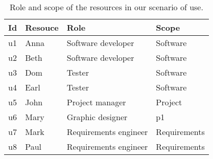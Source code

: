 \begin{table}[]
\centering
\caption{Role and scope of the resources in our scenario of use.}
\label{tab:resource-roles}
\begin{tabular}{@{}llll@{}}
\toprule
 Id &Resouce & Role                  & Scope        \\  \midrule
u1 & Anna     & Software developer    & Software     \\
u2 &Beth     & Software developer    & Software     \\
u3 &Dom      & Tester                & Software     \\
u4 &Earl     & Tester                & Software     \\
u5 &John     & Project manager       & Project      \\
u6 &Mary     & Graphic designer      & p1           \\
u7 &Mark     & Requirements engineer & Requirements \\
u8 &Paul     & Requirements engineer & Requirements \\ \bottomrule
\end{tabular}
\end{table}